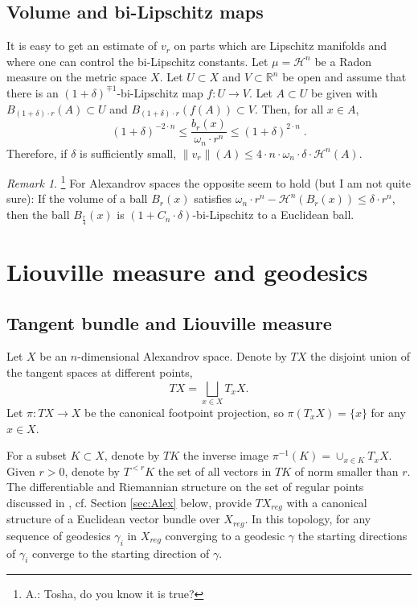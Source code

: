 \documentclass[12pt,leqno,intlimits]{amsart}
\numberwithin{equation}{section}
\theoremstyle{definition}
\theoremstyle{remark}
\newtheorem{rem}[thm]{Remark}
\newcommand{\R}{\mathbb{R}}
\def\:{\colon}
\begin{document}
\subsection{Volume and bi-Lipschitz maps}
It is easy to get an estimate of $v_r$  on parts which are Lipschitz manifolds and where one can control the bi-Lipschitz constants.
Let $\mu =\mathcal H^n$ be a Radon measure on the metric space $X$.
Let $U\subset X$ and $V\subset \R^n$ be open and assume that there is an $(1+\delta)^{\mp1}$-bi-Lipschitz map
$f\:U \to V$.  %
 Let $A\subset U$ be given with
$B_{(1+\delta)\cdot r} (A) \subset U$ and $B_{(1+\delta)\cdot  r} (f(A)) \subset V$.  
Then, for all $x\in A$,
\begin{equation} \label{eq:bilip}
(1+\delta)  ^{-2\cdot n} \leq \frac {b_r(x)} {\omega_n\cdot  r^n} \leq (1+\delta ) ^{2\cdot n} \; .
\end{equation}
Therefore, if $\delta $ is sufficiently small,  $\|v_r \| (A) \leq  4\cdot  n \cdot \omega _n \cdot  \delta \cdot \mathcal H^n (A).$
\begin{rem}  \footnote{A.: Tosha, do you know it is true?} For Alexandrov  spaces the opposite seem to hold (but I am not quite sure):
If the volume of  a ball $B_r (x)$ satisfies $\omega _n\cdot  r^n -\mathcal H^n (B_r (x)) \leq \delta\cdot  r ^n$, then
the ball $B_{\frac r 4} (x)$ is  $(1+C_n\cdot  \delta )$-bi-Lipschitz  to a Euclidean ball.
\end{rem}





\section{Liouville measure and geodesics} \label{sec:Liou}
\subsection{Tangent bundle and Liouville measure} \label{subsec:tb}
Let $X$ be an $n$-dimensional Alexandrov space. 
Denote by $TX$ the  disjoint union of the tangent spaces at different points,
\[TX=\bigsqcup_{x\in X} T_x X.\]
Let $\pi\:TX\to X$ be the canonical footpoint projection, so $\pi (T_xX)=\{x\}$ for any $x\in X$.

For a subset $K\subset X$, denote by $TK$ the inverse image $\pi^{-1} (K)= \cup _{x\in K} T_xX$. 
Given $r>0$, denote by $T^{< r} K$ the set of all vectors in $TK$ of norm smaller than $r$.
 The   differentiable and Riemannian structure on the set of regular points discussed in \cite{Otsu}, cf. Section \ref{sec:Alex} below,  provide  $TX_{reg}$ with a canonical structure of a Euclidean vector bundle over $X_{reg}$. In this topology, for any sequence of geodesics $\gamma _i$ in $X_{reg}$ converging to a geodesic $\gamma$ the starting directions of $\gamma _i$ converge to the starting direction of $\gamma$.
\end{document}
